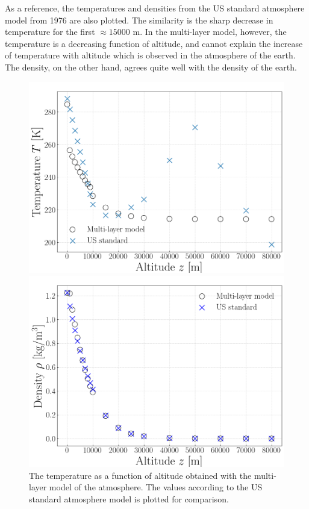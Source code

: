 \documentclass[twocolumn]{article}
\begin{document}
\begin{large}
As a reference, the temperatures and densities from the US standard atmosphere model from 1976 are also plotted. The similarity is the sharp decrease in temperature for the first $\approx 15000$ m. In the multi-layer model, however, the temperature is a decreasing function of altitude, and cannot explain the increase of temperature with altitude which is observed in the atmosphere of the earth. The density, on the other hand, agrees quite well with the density of the earth. 
\begin{figure}[!t]
    \begin{center}
        \includegraphics[scale=0.35]{Temperature.png}
    \end{center}
    \caption{The temperature as a function of altitude obtained with the multi-layer model of the atmosphere. The values according to the US standard atmosphere model is plotted for comparison.}
    \label{9maj2055}
    \begin{center}
        \includegraphics[scale=0.35]{Density.png}

\end{center}
\end{figure}
\end{large}
\end{document}
